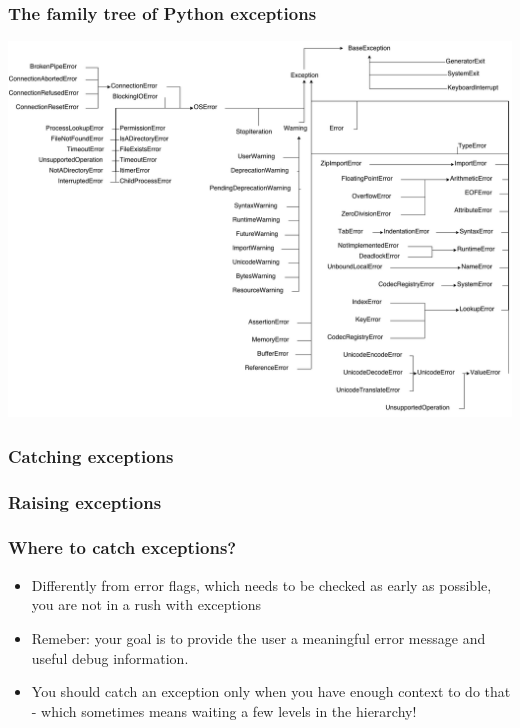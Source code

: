 \documentclass[9pt]{beamer}
\begin{document}
\begin{frame}
  \frametitle{The family tree of Python exceptions}
  \centering\includegraphics[height=0.8\textheight]{python_exceptions}
\end{frame}


\begin{frame}
  \frametitle{Catching exceptions}
  
\end{frame}


\begin{frame}
  \frametitle{Raising exceptions}
  
\end{frame}


\begin{frame}
  \frametitle{Where to catch exceptions?}

  \begin{itemize}
    \item Differently from error flags, which needs to be checked as early as
          possible, you are not in a rush with exceptions
    \item Remeber: your goal is to provide the user a meaningful error message and
          useful debug information.
    \item You should catch an exception only when you have enough context to
          do that - which sometimes means waiting a few levels in the hierarchy!
  \end{itemize}
\end{frame}
\end{document}
